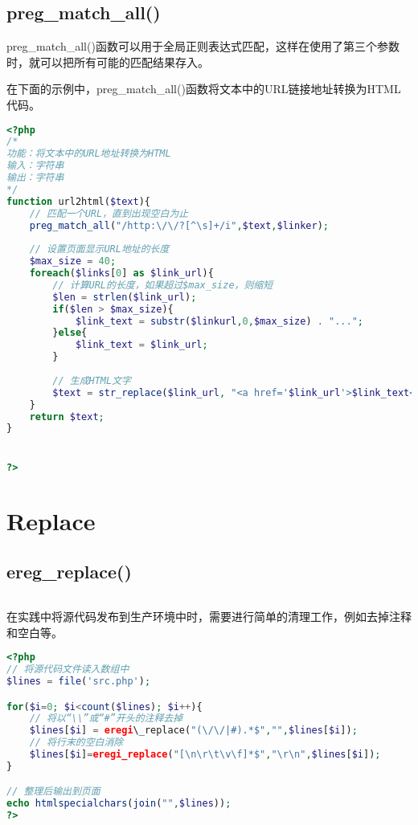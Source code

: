 \begin{lstlisting}[language=PHP]

\end{lstlisting}

\section{preg\_match\_all()}


preg\_match\_all()函数可以用于全局正则表达式匹配，这样在使用了第三个参数时，就可以把所有可能的匹配结果存入。

在下面的示例中，preg\_match\_all()函数将文本中的URL链接地址转换为HTML代码。

\begin{lstlisting}[language=PHP]
<?php
/*
功能：将文本中的URL地址转换为HTML
输入：字符串
输出：字符串
*/
function url2html($text){
	// 匹配一个URL，直到出现空白为止
	preg_match_all("/http:\/\/?[^\s]+/i",$text,$linker);
	
	// 设置页面显示URL地址的长度
	$max_size = 40;
	foreach($links[0] as $link_url){
		// 计算URL的长度，如果超过$max_size，则缩短
		$len = strlen($link_url);
		if($len > $max_size){
			$link_text = substr($linkurl,0,$max_size) . "...";
		}else{
			$link_text = $link_url;
		}
		
		// 生成HTML文字
		$text = str_replace($link_url, "<a href='$link_url'>$link_text</a>",$text);
	}
	return $text;
}


?>
\end{lstlisting}


\chapter{Replace}


\section{ereg\_replace()}



\begin{lstlisting}[language=PHP]

\end{lstlisting}


在实践中将源代码发布到生产环境中时，需要进行简单的清理工作，例如去掉注释和空白等。



\begin{lstlisting}[language=PHP]
<?php
// 将源代码文件读入数组中
$lines = file('src.php');

for($i=0; $i<count($lines); $i++){
	// 将以“\\”或“#”开头的注释去掉
	$lines[$i] = eregi\_replace("(\/\/|#).*$","",$lines[$i]);
	// 将行末的空白消除
	$lines[$i]=eregi_replace("[\n\r\t\v\f]*$","\r\n",$lines[$i]);
}

// 整理后输出到页面
echo htmlspecialchars(join("",$lines));
?>
\end{lstlisting}




